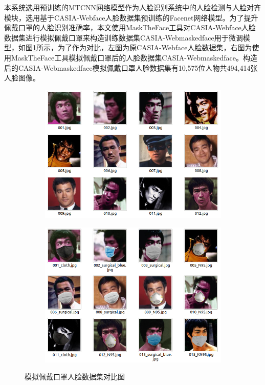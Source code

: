 本系统选用预训练的MTCNN网络模型作为人脸识别系统中的人脸检测与人脸对齐模块，选用基于CASIA-Webface人脸数据集预训练的Facenet网络模型。为了提升佩戴口罩的人脸识别准确率，本文使用MaskTheFace工具对CASIA-Webface人脸数据集进行模拟佩戴口罩来构造训练数据集CASIA-Webmaskedface用于微调模型，如图\ref{fig:cmrsds}所示，为了作为对比，左图为原CASIA-Webface人脸数据集，右图为使用MaskTheFace工具模拟佩戴口罩后的人脸数据集CASIA-Webmaskedface。构造后的CASIA-Webmaskedface模拟佩戴口罩人脸数据集有10,575位人物共494,414张人脸图像。

\begin{figure}[H]
    \centering
    \begin{subfigure}{.45\textwidth}
        \centering
        \includegraphics[width=\textwidth]{figures/4webface.png}
    \end{subfigure}
    \qquad
    \begin{subfigure}{.45\textwidth}
        \centering
        \includegraphics[width=\textwidth]{figures/5webmaskedface.png}
    \end{subfigure}
    \caption{模拟佩戴口罩人脸数据集对比图}
    \label{fig:cmrsds}
\end{figure}

